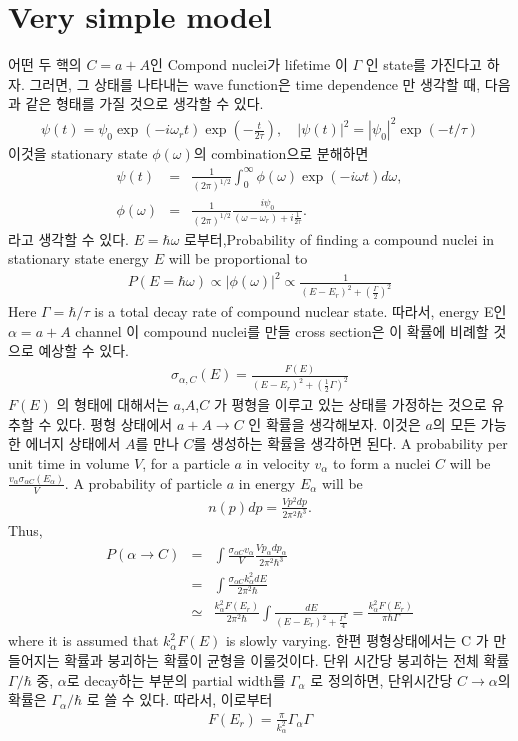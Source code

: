 \documentclass[11pt]{book}
\newcommand{\bea}{\begin{eqnarray}}
\newcommand{\eea}{\end{eqnarray}}
\newcommand{\no}{\nonumber \\}
\begin{document}
\section{Very simple model}
어떤 두 핵의 $C=a+A$인 Compond nuclei가 lifetime 이 $\Gamma$ 인 state를 가진다고 하자. 
그러면, 그 상태를 나타내는 wave function은 time dependence 만 생각할 때, 다음과 같은
형태를 가질 것으로 생각할 수 있다. 
\bea
\psi(t)=\psi_0 \exp(-i\omega_r t) \exp(-\frac{t}{2\tau} ),\quad |\psi(t)|^2=|\psi_0|^2 \exp(-t/\tau)
\eea 
이것을 stationary state $\phi(\omega)$의 combination으로 분해하면
\bea 
\psi(t)&=&\frac{1}{(2\pi)^{1/2}}\int_0^\infty \phi(\omega) \exp(-i\omega t) d\omega, \no 
\phi(\omega)&=& \frac{1}{(2\pi)^{1/2}} \frac{i\psi_0}{(\omega-\omega_r)+i\frac{1}{2\tau} }.
\eea 
라고 생각할 수 있다. $E=\hbar\omega$ 로부터,Probability of finding a compound nuclei in stationary state 
energy $E$ will be proportional to 
\bea 
P(E=\hbar\omega)\propto |\phi(\omega)|^2  \propto \frac{1}{(E-E_r)^2+(\frac{\Gamma}{2})^2}
\eea 
Here $\Gamma=\hbar/\tau$ is a total decay rate of compound nuclear state. 
따라서, energy E인 $\alpha=a+A$ channel 이  compound nuclei를 만들 
cross section은 이 확률에 비례할 것으로 예상할 수 있다. 
\bea 
\sigma_{\alpha,C}(E) =\frac{ F(E)}{(E-E_r)^2+(\frac{1}{2}\Gamma)^2}
\eea 
$F(E)$ 의 형태에 대해서는 $a$,$A$,$C$ 가 평형을 이루고 있는 상태를 가정하는 것으로 유추할 수 있다.
평형 상태에서 $a+A\to C$ 인 확률을 생각해보자. 이것은 $a$의 모든 가능한 에너지 상태에서 
$A$를 만나 $C$를 생성하는 확률을 생각하면 된다. A probability per unit time in volume $V$, 
for a particle $a$ in velocity $v_\alpha$ to form a nuclei $C$ will be $\frac{v_\alpha \sigma_{\alpha C} (E_\alpha)}{V} $. A probability of particle $a$ in energy $E_\alpha$ will be 
\bea 
n(p) dp =\frac{V p^2 dp}{2\pi^2\hbar^3}.
\eea 
Thus, 
\bea 
P(\alpha\to C)&=&\int \frac{\sigma_{\alpha C} v_\alpha}{V} \frac{V p_\alpha dp_\alpha}{2\pi^2\hbar^3} \no 
              &=& \int \frac{\sigma_{\alpha C} k_\alpha^2 dE}{2\pi^2 \hbar} \no 
              &\simeq& \frac{k_\alpha^2 F(E_r)}{2\pi^2\hbar} \int \frac{dE}{(E-E_r)^2+\frac{\Gamma^2}{4}}
               = \frac{k_\alpha^2 F(E_r)}{\pi\hbar \Gamma} 
\eea 
where it is assumed that $k_\alpha^2 F(E)$ is slowly varying. 
한편 평형상태에서는 C 가 만들어지는 확률과 붕괴하는 확률이 균형을 이룰것이다. 
단위 시간당 붕괴하는 전체 확률 $\Gamma/\hbar$ 중, $\alpha$로 decay하는 부분의 partial width를 $\Gamma_\alpha $
로 정의하면,  단위시간당 $C\to \alpha$의 확률은 $\Gamma_\alpha/\hbar$ 로 쓸 수 있다. 
따라서, 이로부터
\bea 
F(E_r)=\frac{\pi}{k_\alpha^2}\Gamma_\alpha \Gamma 
\eea 
\end{document}
